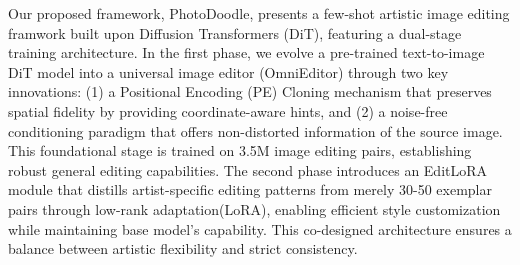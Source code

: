 Our proposed framework, PhotoDoodle, presents a few-shot artistic image editing framwork built upon Diffusion Transformers (DiT), featuring a dual-stage training architecture. In the first phase, we evolve a pre-trained text-to-image DiT model into a universal image editor (OmniEditor) through two key innovations: (1) a Positional Encoding (PE) Cloning mechanism that preserves spatial fidelity by providing coordinate-aware hints, and (2) a noise-free conditioning paradigm that offers non-distorted information of the source image. This foundational stage is trained on 3.5M image editing pairs\cite{ge2024seed}, establishing robust general editing capabilities. The second phase introduces an EditLoRA module that distills artist-specific editing patterns from merely 30-50 exemplar pairs through low-rank adaptation(LoRA), enabling efficient style customization while maintaining base model's capability. This co-designed architecture ensures a balance between artistic flexibility and strict consistency.

